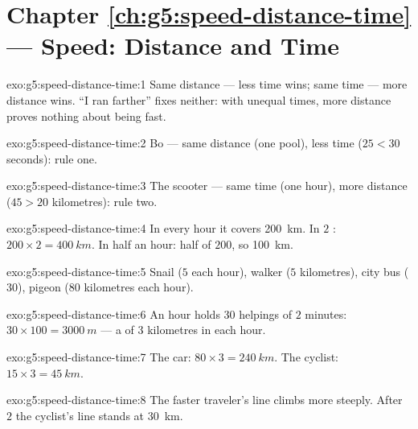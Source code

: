 \section*{Chapter \ref{ch:g5:speed-distance-time} --- Speed: Distance and Time}

\begin{solution}{exo:g5:speed-distance-time:1}
Same distance --- less time wins; same time --- more distance wins.
``I ran farther'' fixes neither: with unequal times, more distance
proves nothing about being fast.
\end{solution}

\begin{solution}{exo:g5:speed-distance-time:2}
Bo --- same distance (one pool), less time ($25 < 30$ seconds):
rule one.
\end{solution}

\begin{solution}{exo:g5:speed-distance-time:3}
The scooter --- same time (one hour), more distance ($45 > 20$
kilometres): rule two.
\end{solution}

\begin{solution}{exo:g5:speed-distance-time:4}
In every hour it covers \qty{200}{km}. In $2$ : $200 \times 2
= \qty{400}{km}$. In half an hour: half of $200$, so \qty{100}{km}.
\end{solution}

\begin{solution}{exo:g5:speed-distance-time:5}
Snail ($5$  each hour), walker ($5$ kilometres), city bus
($30$), pigeon ($80$ kilometres each hour).
\end{solution}

\begin{solution}{exo:g5:speed-distance-time:6}
An hour holds $30$ helpings of $2$ minutes: $30 \times 100 =
\qty{3000}{m}$ --- a  of $3$ kilometres in each hour.
\end{solution}

\begin{solution}{exo:g5:speed-distance-time:7}
The car: $80 \times 3 = \qty{240}{km}$. The cyclist: $15 \times 3 =
\qty{45}{km}$.
\end{solution}

\begin{solution}{exo:g5:speed-distance-time:8}
The faster traveler's line climbs more steeply. After $2$  the
cyclist's line stands at \qty{30}{km}.
\end{solution}

